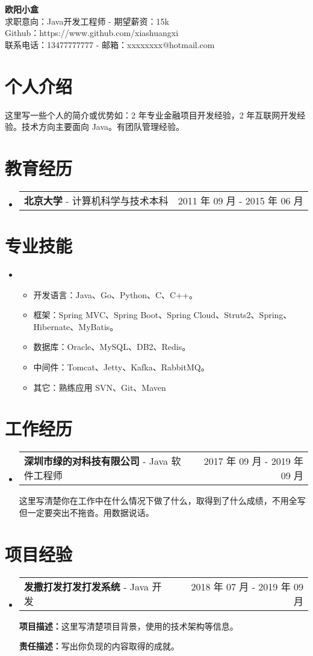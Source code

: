 \documentclass[a4paper,9pt]{article}
\makeatletter
\newcommand{\resumesubheading}[3]{
    \vspace{-1pt}\item[ ]
    \begin{tabular*}{\textwidth}{l@{\extracolsep{\fill}}r}
        \textbf{#1} - #2 & #3
    \end{tabular*}
}
\newcommand{\resumeitem}[2]{\item[]\small{#1：#2}}
\newcommand{\resumesubheadinglists}{\begin{itemize}[leftmargin=0mm]}
\newcommand{\resumesubheadingliste}{\end{itemize}}
\newcommand{\resumeitemlists}{\begin{itemize}}
\newcommand{\resumeitemliste}{\end{itemize}}
\makeatother
\begin{document}
    \begin{center}
        \textbf{\Large{欧阳小盒}} \\ 
        {求职意向：Java开发工程师} - {期望薪资：15k}\\ 
        {Github：https://www.github.com/xiashuangxi}\\ 
        {联系电话：13477777777} - {邮箱：xxxxxxxx@hotmail.com}
    \end{center}

    \section{个人介绍}
    {这里写一些个人的简介或优势如：2 年专业金融项目开发经验，2 年互联网开发经验。技术方向主要面向 Java。有团队管理经验。}

    \section{教育经历}
        \resumesubheadinglists
            \resumesubheading{北京大学}{计算机科学与技术本科}{2011 年 09 月 - 2015 年 06 月}
        \resumesubheadingliste

    \section{专业技能}
        \resumesubheadinglists
            \item[]
                \resumeitemlists
                    \resumeitem{开发语言}
                    {Java、Go、Python、C、C++。}
                    \resumeitem{框架}
                    {Spring MVC、Spring Boot、Spring Cloud、Struts2、Spring、Hibernate、MyBatis。 }
                    \resumeitem{数据库}
                    {Oracle、MySQL、DB2、Redis。}
                    \resumeitem{中间件}
                    {Tomcat、Jetty、Kafka、RabbitMQ。}
                    \resumeitem{其它}
                    {熟练应用 SVN、Git、Maven }
                \resumeitemliste
        \resumesubheadingliste
    
    \section{工作经历}
        \resumesubheadinglists
            \resumesubheading{深圳市绿的对科技有限公司}{Java 软件工程师}{2017 年 09 月 - 2019 年 09 月}
            这里写清楚你在工作中在什么情况下做了什么，取得到了什么成绩，不用全写但一定要突出不拖沓。用数据说话。
        \resumesubheadingliste

    \section{项目经验}
        \resumesubheadinglists
            \resumesubheading{发撒打发打发打发系统}{ Java 开发}{2018 年 07 月 - 2019 年 09 月}
                \textbf{项目描述：}这里写清楚项目背景，使用的技术架构等信息。

                \textbf{责任描述：}写出你负现的内容取得的成就。
        \resumesubheadingliste
\end{document}
